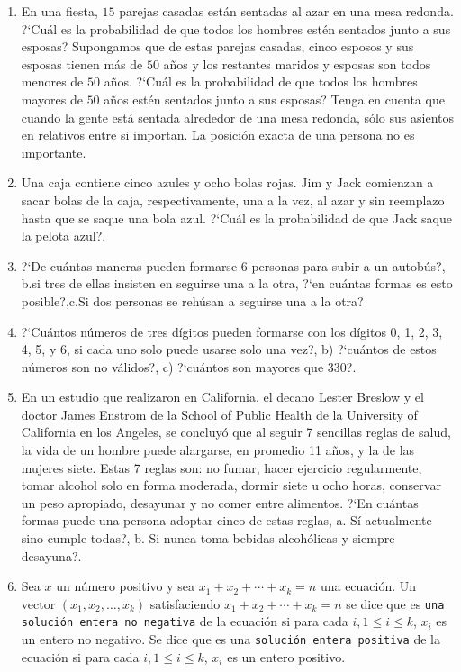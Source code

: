 \documentclass[a4paper,11pt]{report}
\begin{document}
\begin{enumerate}
\item En una fiesta, $15$ parejas casadas est\'an sentadas al azar en una mesa redonda. ?`Cu\'al es la probabilidad de que todos los hombres est\'en sentados junto a sus esposas? Supongamos que de estas parejas casadas, cinco esposos y sus esposas tienen m\'as de $50$ a\~nos y los restantes maridos y esposas son todos menores de $50$ a\~nos. ?`Cu\'al es la probabilidad de que todos los hombres mayores de $50$ a\~nos est\'en sentados junto a sus esposas? Tenga en cuenta que cuando la gente est\'a sentada alrededor de una mesa redonda, s\'olo sus asientos en relativos  entre si importan. La posici\'on exacta de una persona no es importante. 
\item Una caja contiene cinco azules y ocho bolas rojas. Jim y Jack comienzan a sacar bolas de la caja, respectivamente, una a la vez, al azar y sin reemplazo hasta que se saque una bola azul. ?`Cu\'al es la probabilidad de que Jack saque la pelota azul?.             

\item ?`De cu\'antas maneras pueden formarse 6 personas para subir a un autob\'us?, b.si tres de ellas insisten en seguirse una a la otra, ?`en cu\'antas formas es esto posible?,c.Si dos personas se reh\'usan a seguirse una a la otra?

\item ?`Cu\'antos n\'umeros de tres d\'igitos pueden formarse con los d\'igitos 0, 1, 2, 3, 4, 5, y 6, si cada uno solo puede usarse solo una vez?, b) ?`cu\'antos de estos n\'umeros son no v\'alidos?, c) ?`cu\'antos son mayores que 330?.    

\item En un estudio que realizaron en California, el decano Lester Breslow y el doctor James Enstrom de la School of  Public Health de la University of California en los Angeles, se concluy\'o que al seguir 7 sencillas reglas de salud, la vida de un hombre puede alargarse, en promedio 11 a\~nos, y la de las mujeres siete. Estas 7 reglas son: no fumar, hacer ejercicio regularmente, tomar alcohol solo en forma moderada, dormir siete u ocho horas, conservar un peso apropiado, desayunar y no comer entre alimentos. ?`En cu\'antas formas puede una persona adoptar cinco de estas reglas, a. S\'i actualmente sino cumple  todas?, b. Si nunca toma bebidas alcoh\'olicas y siempre desayuna?.   

\item Sea $x$ un n\'umero positivo y sea $x_1 + x_2 + \cdots + x_k = n$ una ecuaci\'on. Un vector $(x_1, x_2, \dots, x_k)$ satisfaciendo  $x_1 + x_2 + \cdots + x_k = n$  se dice que es \texttt{una soluci\'on entera no negativa} de la ecuaci\'on si para cada $i, 1 \leq i \leq k$, $x_i$ es un entero no negativo. Se dice que es una \texttt{soluci\'on entera positiva} de la ecuaci\'on  si para cada $i, 1\leq i \leq k$, $x_i$ es un entero positivo. 


\end{enumerate}
\end{document}
